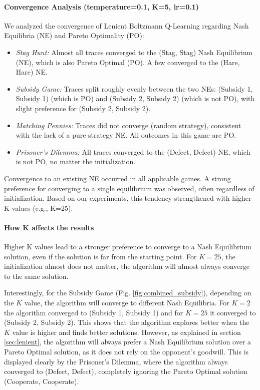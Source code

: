 \documentclass[12pt,a4paper, onecolumn]{exam}
\begin{document}
\paragraph{Convergence Analysis (temperature=0.1, K=5, lr=0.1)}
We analyzed the convergence of Lenient Boltzmann Q-Learning regarding Nash Equilibria (NE) and Pareto Optimality (PO):

\begin{itemize}
    \item \textit{Stag Hunt:} Almost all traces converged to the (Stag, Stag) Nash Equilibrium (NE),
          which is also Pareto Optimal (PO). A few converged to the (Hare, Hare) NE.
    \item \textit{Subsidy Game:} Traces split roughly evenly between the two NEs: (Subsidy 1, Subsidy 1) (which is PO)
          and (Subsidy 2, Subsidy 2) (which is not PO), with slight preference for (Subsidy 2, Subsidy 2).
    \item \textit{Matching Pennies:} Traces did not converge (random strategy), consistent with the lack of a pure strategy NE.
          All outcomes in this game are PO.
    \item \textit{Prisoner's Dilemma:} All traces converged to the (Defect, Defect) NE, which is not PO, no matter the initialization.
\end{itemize}

Convergence to an existing NE occurred in all applicable games. A strong preference for converging to a
single equilibrium was observed, often regardless of initialization. Based on our experiments, this tendency
strengthened with higher K values (e.g., K=25).

\paragraph{How K affects the results}

Higher K values lead to a stronger preference to converge to a Nash Equilibrium solution, even if the solution is far from the starting point.
For $K=25$, the initialization almost does not matter, the algorithm will almost always converge to the same solution.

Interestingly, for the Subsidy Game (Fig. \ref{fig:combined_subsidy}), depending on the $K$ value, the algorithm will converge to different Nash Equilibria.
For $K=2$ the algorithm converged to (Subsidy 1, Subsidy 1) and for $K=25$ it converged to (Subsidy 2, Subsidy 2). This shows that the algorithm
explores better when the $K$ value is higher and finds better solutions. However, as explained in section \ref{sec:lenient},
the algorithm will always prefer a Nash Equilibrium solution over a Pareto Optimal solution, as it does not rely on the opponent's goodwill.
This is displayed clearly by the Prisoner's Dilemma, where the algorithm always converged to (Defect, Defect), completely ignoring
the Pareto Optimal solution (Cooperate, Cooperate).
\end{document}
